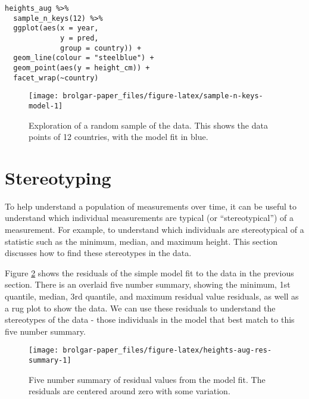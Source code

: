 \begin{verbatim}
heights_aug %>% 
  sample_n_keys(12) %>% 
  ggplot(aes(x = year,
             y = pred,
             group = country)) + 
  geom_line(colour = "steelblue") +
  geom_point(aes(y = height_cm)) + 
  facet_wrap(~country)
\end{verbatim}

\begin{figure}

{\centering \texttt{[image: brolgar-paper\_files/figure-latex/sample-n-keys-model-1]} 

}

\caption{Exploration of a random sample of the data. This shows the data points of 12 countries, with the model fit in blue.}\label{fig:sample-n-keys-model}
\end{figure}

\hypertarget{stereotyping}{%
\section{Stereotyping}\label{stereotyping}}

To help understand a population of measurements over time, it can be useful to understand which individual measurements are typical (or ``stereotypical'') of a measurement. For example, to understand which individuals are stereotypical of a statistic such as the minimum, median, and maximum height. This section discusses how to find these stereotypes in the data.

Figure \ref{fig:heights-aug-res-summary} shows the residuals of the simple model fit to the data in the previous section. There is an overlaid five number summary, showing the minimum, 1st quantile, median, 3rd quantile, and maximum residual value residuals, as well as a rug plot to show the data. We can use these residuals to understand the stereotypes of the data - those individuals in the model that best match to this five number summary.

\begin{figure}

{\centering \texttt{[image: brolgar-paper\_files/figure-latex/heights-aug-res-summary-1]} 

}

\caption{Five number summary of residual values from the model fit. The residuals are centered around zero with some variation.}\label{fig:heights-aug-res-summary}
\end{figure}

